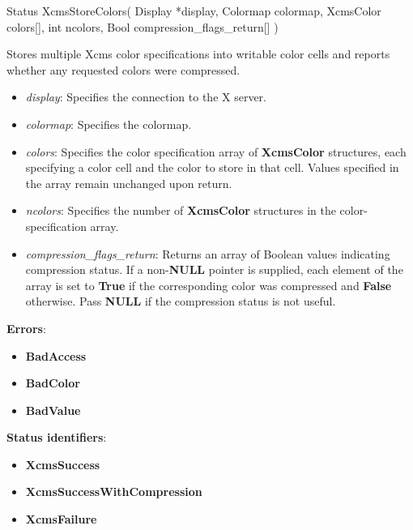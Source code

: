 \documentclass{report}
\begin{document}
\begin{itemize}
            \begin{cppcode}
                Status XcmsStoreColors(
                    Display *display,
                    Colormap colormap,
                    XcmsColor colors[],
                    int ncolors,
                    Bool compression_flags_return[]
                )
            \end{cppcode}
            \bigbreak \noindent
            Stores multiple Xcms color specifications into writable color cells and reports whether any requested colors were compressed.
            \begin{itemize}
                \item \textit{display}: Specifies the connection to the X server.
                \item \textit{colormap}: Specifies the colormap.
                \item \textit{colors}: Specifies the color specification array of \textbf{XcmsColor} structures, each specifying a color cell and the color to store in that cell. Values specified in the array remain unchanged upon return.
                \item \textit{ncolors}: Specifies the number of \textbf{XcmsColor} structures in the color-specification array.
                \item \textit{compression\_flags\_return}: Returns an array of Boolean values indicating compression status. If a non-\textbf{NULL} pointer is supplied, each element of the array is set to \textbf{True} if the corresponding color was compressed and \textbf{False} otherwise. Pass \textbf{NULL} if the compression status is not useful.
            \end{itemize}
            \bigbreak \noindent
            \textbf{Errors}:
            \begin{itemize}
                \item \textbf{BadAccess}
                \item \textbf{BadColor}
                \item \textbf{BadValue}
            \end{itemize}
            \bigbreak \noindent
            \textbf{Status identifiers}:
            \begin{itemize}
                \item \textbf{XcmsSuccess}
                \item \textbf{XcmsSuccessWithCompression}
                \item \textbf{XcmsFailure}
            \end{itemize}


\end{itemize}
\end{document}
